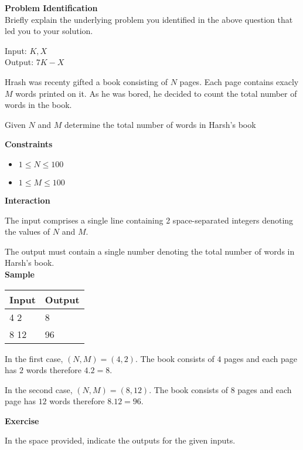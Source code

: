 \documentclass[a4paper]{exam}
\newcommand\heading[1]{\textbf{#1}}
\begin{document}
\begin{questions}
    \heading{Problem Identification}\\
    Briefly explain the underlying problem you identified in the above question that led you to your solution.

    \begin{mdframed}
      Input: $K,X$\\
      Output: $7K-X$
    \end{mdframed}


    Hrash was recenty gifted a book consisting of $N$ pages. Each page contains exacly $M$ words printed on it.
    As he was bored, he decided to count the total number of words in the book.



    Given $N$ and $M$ determine the total number of words in Harsh's book

    \heading{Constraints}
    \begin{itemize}
        \item $1 \le N \le 100$
        \item $1 \le M \le 100$
    \end{itemize}


    \heading{Interaction}

    The input comprises a single line containing 2 space-separated integers denoting the values of $N$ and $M$.

    The output must contain a single number denoting the total number of words in Harsh's book.\\

    \heading{Sample}

    \begin{tabularx}{\textwidth}{|X|X|}
        \rowcolor{gray!50}
        \hline
        Input & Output \\ \hline\hline
        4 2   & 8      \\\hline
        8 12  & 96     \\\hline
    \end{tabularx}

    In the first case, $(N,M)=(4,2)$. The book consists of $4$ pages and each page has $2$ words therefore $4.2=8$.

    In the second case, $(N,M)=(8,12)$. The book consists of $8$ pages and each page has $12$ words therefore $8.12=96$.

    \heading{Exercise}

    In the space provided, indicate the outputs for the given inputs.


\end{questions}
\end{document}
